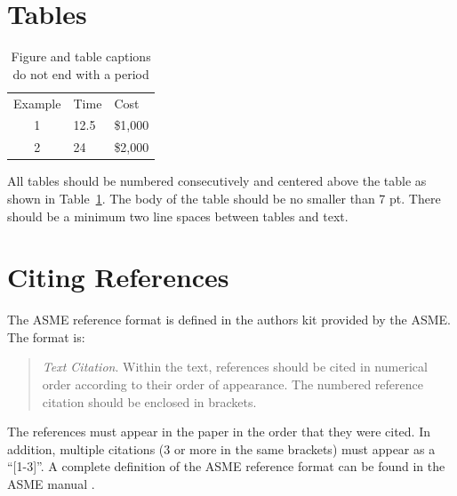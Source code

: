 \documentclass[twocolumn,10pt,journal]{asme2e}
\begin{document}
\section{Tables}

\begin{table}[t]
 \caption{Figure and table captions do not end with a period}
 \begin{center}
  \label{table_ASME}
  \begin{tabular}{c l l}
   & & \\ %
   \hline Example & Time & Cost \\
   \hline 1 &
   12.5 &
   \$1,000 \\
   2 &
   24 &
   \$2,000 \\
   \hline
  \end{tabular}
 \end{center}
\end{table}

All tables should be numbered consecutively and centered above the table as shown in Table~\ref{table_ASME}.
The body of the table should be no smaller than 7 pt.
There should be a minimum two line spaces between tables and text.


\section{Citing References}

The ASME reference format is defined in the authors kit provided by the ASME. The format is:

\begin{quotation}
 {\em Text Citation}.
 Within the text, references should be cited in numerical order according to their order of appearance.
 The numbered reference citation should be enclosed in brackets.
\end{quotation}

The references must appear in the paper in the order that they were cited.
In addition, multiple citations (3 or more in the same brackets) must appear as a ``[1-3]''.
A complete definition of the ASME reference format can be found in the ASME manual \cite{asmemanual}.
\end{document}
